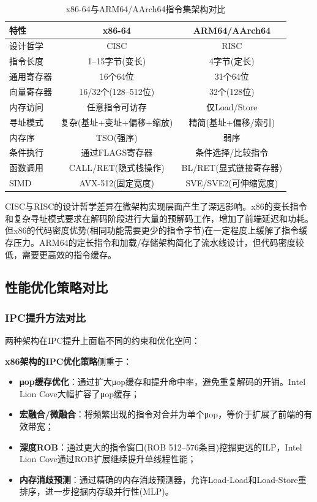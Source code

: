 \documentclass[12pt,a4paper]{IEEEtran}
\begin{document}
\begin{table}[htbp]
\centering
\caption{x86-64与ARM64/AArch64指令集架构对比}
\label{tab:isa_comparison}
\begin{tabular}{lcc}
\toprule
\textbf{特性} & \textbf{x86-64} & \textbf{ARM64/AArch64} \\
\midrule
设计哲学 & CISC & RISC \\
指令长度 & 1--15字节(变长) & 4字节(定长) \\
通用寄存器 & 16个64位 & 31个64位 \\
向量寄存器 & 16/32个(128--512位) & 32个(128位) \\
内存访问 & 任意指令可访存 & 仅Load/Store \\
寻址模式 & 复杂(基址+变址+偏移+缩放) & 精简(基址+偏移/索引) \\
内存序 & TSO(强序) & 弱序 \\
条件执行 & 通过FLAGS寄存器 & 条件选择/比较指令 \\
函数调用 & CALL/RET(隐式栈操作) & BL/RET(显式链接寄存器) \\
SIMD & AVX-512(固定宽度) & SVE/SVE2(可伸缩宽度) \\
\bottomrule
\end{tabular}
\end{table}

CISC与RISC的设计哲学差异在微架构实现层面产生了深远影响。x86的变长指令和复杂寻址模式要求在解码阶段进行大量的预解码工作，增加了前端延迟和功耗。但x86的代码密度优势(相同功能需要更少的指令字节)在一定程度上缓解了指令缓存压力。ARM64的定长指令和加载/存储架构简化了流水线设计，但代码密度较低，需要更高效的指令缓存。

\subsection{性能优化策略对比}

\subsubsection{IPC提升方法对比}

两种架构在IPC提升上面临不同的约束和优化空间：

\textbf{x86架构的IPC优化策略}侧重于：
\begin{itemize}
\item \textbf{μop缓存优化}：通过扩大μop缓存和提升命中率，避免重复解码的开销。Intel Lion Cove大幅扩容了μop缓存；
\item \textbf{宏融合/微融合}：将频繁出现的指令对合并为单个μop，等价于扩展了前端的有效带宽；
\item \textbf{深度ROB}：通过更大的指令窗口(ROB 512--576条目)挖掘更远的ILP，Intel Lion Cove通过ROB扩展继续提升单线程性能；
\item \textbf{内存消歧预测}：通过精确的内存消歧预测器，允许Load-Load和Load-Store重排序，进一步挖掘内存级并行性(MLP)。
\end{itemize}
\end{document}
